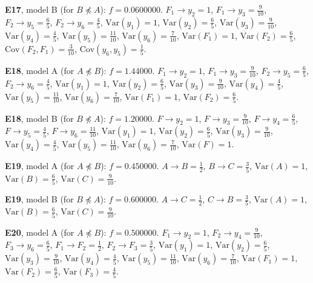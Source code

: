 \documentclass[10pt,a4paper]{article}
\newcommand{\nnest}{\not\preceq}
\begin{document}
{\noindent\textbf{E17}, model B (for $B\nnest A$): $f=0.0600000$. {\footnotesize $F_{1}\to y_{2}=1$, $F_{1}\to y_{3}=\tfrac{9}{10}$, $F_{2}\to y_{5}=\tfrac{6}{5}$, $F_{2}\to y_{6}=\tfrac{4}{5}$, $\mathrm{Var}(y_{1})=1$, $\mathrm{Var}(y_{2})=\tfrac{6}{5}$, $\mathrm{Var}(y_{3})=\tfrac{9}{10}$, $\mathrm{Var}(y_{4})=\tfrac{4}{5}$, $\mathrm{Var}(y_{5})=\tfrac{11}{10}$, $\mathrm{Var}(y_{6})=\tfrac{7}{10}$, $\mathrm{Var}(F_{1})=1$, $\mathrm{Var}(F_{2})=\tfrac{6}{5}$, $\mathrm{Cov}(F_{2},F_{1})=\tfrac{3}{10}$, $\mathrm{Cov}(y_{6},y_{5})=\tfrac{1}{5}$.}\par\smallskip
\noindent\textbf{E18}, model A (for $A\nnest B$): $f=1.44000$. {\footnotesize $F_{1}\to y_{2}=1$, $F_{1}\to y_{3}=\tfrac{9}{10}$, $F_{2}\to y_{5}=\tfrac{6}{5}$, $F_{2}\to y_{6}=\tfrac{4}{5}$, $\mathrm{Var}(y_{1})=1$, $\mathrm{Var}(y_{2})=\tfrac{6}{5}$, $\mathrm{Var}(y_{3})=\tfrac{9}{10}$, $\mathrm{Var}(y_{4})=\tfrac{4}{5}$, $\mathrm{Var}(y_{5})=\tfrac{11}{10}$, $\mathrm{Var}(y_{6})=\tfrac{7}{10}$, $\mathrm{Var}(F_{1})=1$, $\mathrm{Var}(F_{2})=\tfrac{6}{5}$.}\par\smallskip
\noindent\textbf{E18}, model B (for $B\nnest A$): $f=1.20000$. {\footnotesize $F\to y_{2}=1$, $F\to y_{3}=\tfrac{9}{10}$, $F\to y_{4}=\tfrac{6}{5}$, $F\to y_{5}=\tfrac{4}{5}$, $F\to y_{6}=\tfrac{11}{10}$, $\mathrm{Var}(y_{1})=1$, $\mathrm{Var}(y_{2})=\tfrac{6}{5}$, $\mathrm{Var}(y_{3})=\tfrac{9}{10}$, $\mathrm{Var}(y_{4})=\tfrac{4}{5}$, $\mathrm{Var}(y_{5})=\tfrac{11}{10}$, $\mathrm{Var}(y_{6})=\tfrac{7}{10}$, $\mathrm{Var}(F)=1$.}\par\smallskip
\noindent\textbf{E19}, model A (for $A\nnest B$): $f=0.450000$. {\footnotesize $A\to B=\tfrac{1}{2}$, $B\to C=\tfrac{3}{5}$, $\mathrm{Var}(A)=1$, $\mathrm{Var}(B)=\tfrac{6}{5}$, $\mathrm{Var}(C)=\tfrac{9}{10}$.}\par\smallskip
\noindent\textbf{E19}, model B (for $B\nnest A$): $f=0.600000$. {\footnotesize $A\to C=\tfrac{1}{2}$, $C\to B=\tfrac{3}{5}$, $\mathrm{Var}(A)=1$, $\mathrm{Var}(B)=\tfrac{6}{5}$, $\mathrm{Var}(C)=\tfrac{9}{10}$.}\par\smallskip
\noindent\textbf{E20}, model A (for $A\nnest B$): $f=0.500000$. {\footnotesize $F_{1}\to y_{2}=1$, $F_{2}\to y_{4}=\tfrac{9}{10}$, $F_{3}\to y_{6}=\tfrac{6}{5}$, $F_{1}\to F_{2}=\tfrac{1}{2}$, $F_{2}\to F_{3}=\tfrac{3}{5}$, $\mathrm{Var}(y_{1})=1$, $\mathrm{Var}(y_{2})=\tfrac{6}{5}$, $\mathrm{Var}(y_{3})=\tfrac{9}{10}$, $\mathrm{Var}(y_{4})=\tfrac{4}{5}$, $\mathrm{Var}(y_{5})=\tfrac{11}{10}$, $\mathrm{Var}(y_{6})=\tfrac{7}{10}$, $\mathrm{Var}(F_{1})=1$, $\mathrm{Var}(F_{2})=\tfrac{6}{5}$, $\mathrm{Var}(F_{3})=\tfrac{4}{5}$.}\par\smallskip
}
\end{document}
